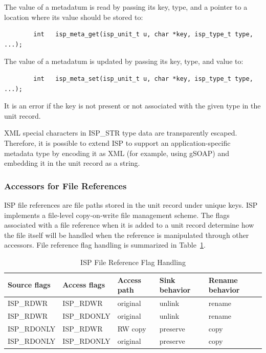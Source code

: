 \documentclass{article}
\begin{document}
The value of a metadatum is read by passing its key, type, and a pointer
to a location where its value should be stored to:
\begin{verbatim}
        int   isp_meta_get(isp_unit_t u, char *key, isp_type_t type, ...);
\end{verbatim}

The value of a metadatum is updated by passing its key, type, and value to:
\begin{verbatim}
        int   isp_meta_set(isp_unit_t u, char *key, isp_type_t type, ...);
\end{verbatim}
It is an error if the key is not present or not associated with
the given type in the unit record.

XML special characters in ISP\_STR type data are transparently escaped.
Therefore, it is possible to extend ISP to support an application-specific
metadata type by encoding it as XML (for example, using gSOAP) and 
embedding it in the unit record as a string.

\subsubsection{Accessors for File References}\label{secfileacc}

ISP file references are file paths stored in the unit record
under unique keys.  ISP implements a file-level copy-on-write
file management scheme.  The flags associated with a file
reference when it is added to a unit record determine how the file
itself will be handled when the reference is manipulated through other
accessors.  File reference flag handling is summarized in 
Table~\ref{tabfileflags}.

\begin{table}
\begin{center}
\begin{tabular}{|l|l|l|l|l|}\hline
Source flags  & Access flags  & Access path & Sink behavior & Rename behavior \\
\hline
ISP\_RDWR   & ISP\_RDWR   & original & unlink   & rename \\
ISP\_RDWR   & ISP\_RDONLY & original & unlink   & rename \\
ISP\_RDONLY & ISP\_RDWR   & RW copy  & preserve & copy \\
ISP\_RDONLY & ISP\_RDONLY & original & preserve & copy \\
\hline
\end{tabular}
\caption{ISP File Reference Flag Handling}
\label{tabfileflags}
\end{center}
\end{table}
\end{document}
